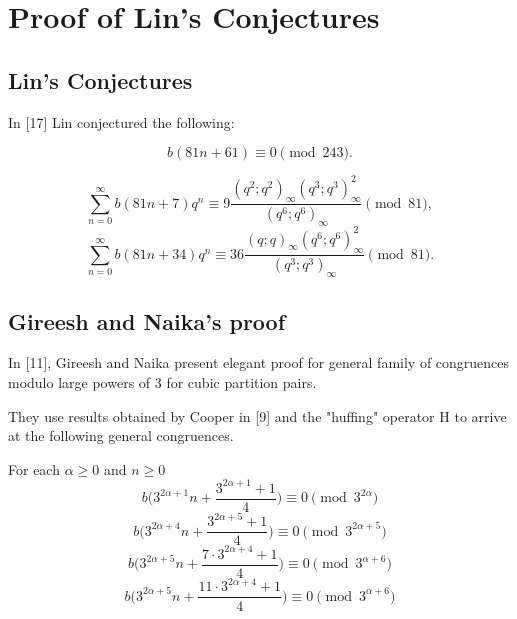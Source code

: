 \chapter{Proof of Lin's Conjectures}

\section{Lin's Conjectures}

In [17] Lin conjectured the following:
\begin{conjecture}
\begin{equation}
    b(81n + 61) \equiv 0 \pmod{243}.
\end{equation}
\end{conjecture}

\begin{conjecture}
\begin{equation}
    \sum_{n=0}^\infty b(81n + 7)q^n \equiv 9 \frac{(q^2;q^2)_\infty(q^3;q^3)^2_\infty}{(q^6;q^6)_\infty} \pmod{81},
\end{equation}
\begin{equation}
    \sum_{n=0}^\infty b(81n + 34)q^n \equiv 36 \frac{(q;q)_\infty(q^6;q^6)^2_\infty}{(q^3;q^3)_\infty} \pmod{81}.
\end{equation}
\end{conjecture}

\newpage

\section{Gireesh and Naika's proof}
In [11], Gireesh and Naika present elegant proof for general family of congruences modulo large powers of 3 for cubic partition pairs.

They use results obtained by Cooper in [9] and the "huffing" operator H to arrive at the following general congruences.
\begin{theorem}
For each $\alpha \geq 0$ and $n \geq 0$
\begin{equation}
    b\bigg(3^{2\alpha + 1}n + \frac{3^{2\alpha + 1} + 1}{4}\bigg) \equiv 0 \pmod{3^{2\alpha}}
\end{equation}
\begin{equation}
    b\bigg(3^{2\alpha + 4}n + \frac{3^{2\alpha + 5} + 1}{4}\bigg) \equiv 0 \pmod{3^{2\alpha + 5}}
\end{equation}
\begin{equation}
    b\bigg(3^{2\alpha + 5}n + \frac{7\cdot 3^{2\alpha + 4} + 1}{4}\bigg) \equiv 0 \pmod{3^{\alpha + 6}}
\end{equation}
\begin{equation}
    b\bigg(3^{2\alpha + 5}n + \frac{11\cdot 3^{2\alpha + 4} + 1}{4}\bigg) \equiv 0 \pmod{3^{\alpha + 6}}
\end{equation}
\end{theorem}

